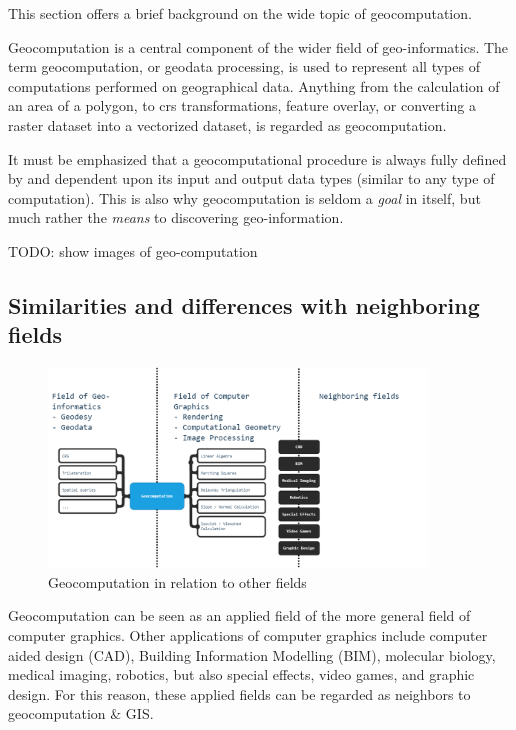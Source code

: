 This section offers a brief background on the wide topic of geocomputation. 


Geocomputation is a central component of the wider field of geo-informatics. 
The term geocomputation, or geodata processing, is used to represent all types of computations performed on geographical data. 
Anything from the calculation of an area of a polygon, to \ac{crs} transformations, feature overlay, or converting a raster dataset into a vectorized dataset, is regarded as geocomputation.

It must be emphasized that a geocomputational procedure is always fully defined by and dependent upon its input and output data types (similar to any type of computation). 
This is also why geocomputation is seldom a \emph{goal} in itself, but much rather the \emph{means} to discovering geo-information. 

\begin{note}
  TODO: show images of geo-computation
\end{note}

\subsection{Similarities and differences with neighboring fields}

\begin{figure}
  \centering
  \graphicspath{ {../../assets/diagrams/} }
  \includegraphics[width=380px]{geocomputation.png}
  \caption{Geocomputation in relation to other fields}
  \label{fig:geocomputation}
\end{figure}

Geocomputation can be seen as an applied field of the more general field of computer graphics. 
Other applications of computer graphics include computer aided design (CAD), Building Information Modelling (BIM), molecular biology, medical imaging, robotics, but also special effects, video games, and graphic design.
For this reason, these applied fields can be regarded as neighbors to geocomputation \& GIS. 

